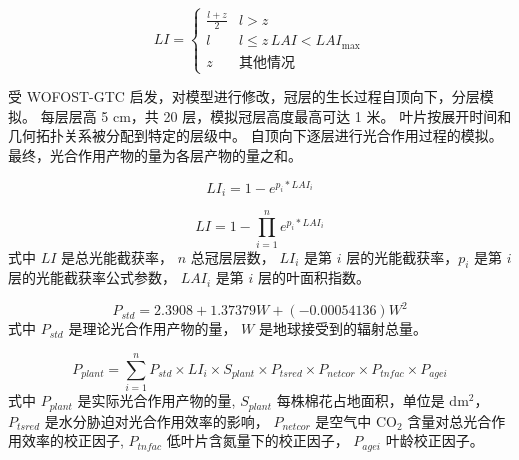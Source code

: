 \begin{equation}\label{eq:li}
    LI = \begin{cases}
        \frac{l + z}{2} & l > z                   \\
        l               & l\le z \, LAI<LAI_{\max} \\
        z               & \text{其他情况}
    \end{cases}
\end{equation}

受 WOFOST-GTC\cite{WOFOSTGTC} 启发，对模型进行修改，冠层的生长过程自顶向下，分层模拟。
每层层高 5 cm，共 20 层，模拟冠层高度最高可达 1 米。
叶片按展开时间和几何拓扑关系被分配到特定的层级中。
自顶向下逐层进行光合作用过程的模拟。
最终，光合作用产物的量为各层产物的量之和。

\begin{equation}
    LI_i = 1 - e^{p_i * LAI_i}
\end{equation}

\begin{equation}
    LI = 1 - \prod^{n}_{i=1}e^{p_i * LAI_i}
\end{equation}
式中 $LI$ 是总光能截获率， $n$ 总冠层层数， $LI_i$ 是第 $i$ 层的光能截获率，$p_i$ 是第 $i$ 层的光能截获率公式参数，
$LAI_i$ 是第 $i$ 层的叶面积指数。

\begin{equation}%
    P_{std} = 2.3908 + 1.37379 W + (-0.00054136) W^2%
\end{equation}%
式中 $P_{std}$ 是理论光合作用产物的量， $W$ 是地球接受到的辐射总量。%

\begin{equation}%
    P_{plant} = \sum^n_{i=1} P_{std} \times LI_i \times S_{plant} \times P_{tsred} \times P_{netcor} \times P_{tnfac} \times P_{agei}%
\end{equation}%
式中 $P_{plant}$ 是实际光合作用产物的量, $S_{plant}$ 每株棉花占地面积，单位是 $\mathrm{dm^2}$，%
$P_{tsred}$ 是水分胁迫对光合作用效率的影响，%
$P_{netcor}$ 是空气中 $\mathrm{CO_2}$ 含量对总光合作用效率的校正因子,%
$P_{tnfac}$ 低叶片含氮量下的校正因子，%
$P_{agei}$ 叶龄校正因子。
